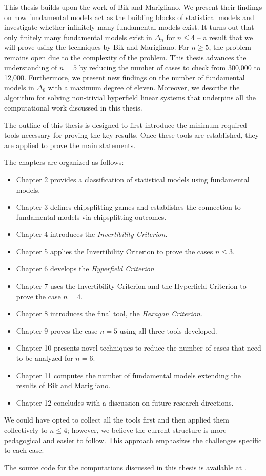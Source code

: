 This thesis builds upon the work of Bik and Marigliano. We present their findings on how fundamental models act as the building blocks of statistical models and investigate whether infinitely many fundamental models exist. It turns out that only finitely many fundamental models exist in \( \Delta_n \) for \( n \leq 4 \) -- a result that we will prove using the techniques by Bik and Marigliano. For \( n \geq 5 \), the problem remains open due to the complexity of the problem. This thesis advances the understanding of \( n = 5 \) by reducing the number of cases to check from 300,000 to 12,000. Furthermore, we present new findings on the number of fundamental models in \( \Delta_6 \) with a maximum degree of eleven. Moreover, we describe the algorithm for solving non-trivial hyperfield linear systems that underpins all the computational work discussed in this thesis. 

The outline of this thesis is designed to first introduce the minimum required tools necessary for proving the key results. Once these tools are established, they are applied to prove the main statements. 

The chapters are organized as follows:
\begin{itemize}
    \item Chapter 2 provides a classification of statistical models using fundamental models.
    \item Chapter 3 defines chipsplitting games and establishes the connection to fundamental models via chipsplitting outcomes.
    \item Chapter 4 introduces the \emph{Invertibility Criterion}.
    \item Chapter 5 applies the Invertibility Criterion to prove the cases \( n \leq 3 \).
    \item Chapter 6 develops the \emph{Hyperfield Criterion}
    \item Chapter 7 uses the Invertibility Criterion and the Hyperfield Criterion to prove the case \( n = 4 \).
    \item Chapter 8 introduces the final tool, the \emph{Hexagon Criterion}.
    \item Chapter 9 proves the case \( n = 5 \) using all three tools developed.
    \item Chapter 10 presents novel techniques to reduce the number of cases that need to be analyzed for \( n = 6 \).
    \item Chapter 11 computes the number of fundamental models extending the results of Bik and Marigliano.
    \item Chapter 12 concludes with a discussion on future research directions.
\end{itemize}


We could have opted to collect all the tools first and then applied them collectively to \( n \leq 4 \); however, we believe the current structure is more pedagogical and easier to follow. This approach emphasizes the challenges specific to each case.

The source code for the computations discussed in this thesis is available at \cite{ducrepo}.